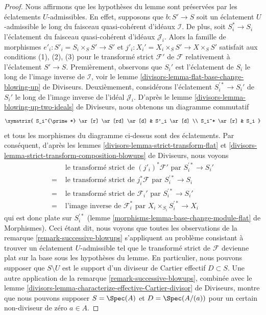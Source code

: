 \begin{proof}
Nous affirmons que les hypothèses du lemme sont préservées par les éclatements $U$-admissibles.
En effet, supposons que $b : S' \to S$ soit un éclatement $U$-admissible le long du
faisceau quasi-cohérent d'idéaux $\mathcal{I}$. De plus, soit $S^*_i \to S_i$
l'éclatement du faisceau quasi-cohérent d'idéaux $\mathcal{J}_i$.
Alors la famille de morphismes $e'_i : S'_i = S_i \times_S S' \to S'$
et $j'_i : X_i' = X_i \times_S S' \to X \times_S S'$ satisfait aux conditions
(1), (2), (3) pour le transformé strict $\mathcal{F}'$ de $\mathcal{F}$
relativement à l'éclatement $S' \to S$. Premièrement, observons que $S_i'$ est
l'éclatement de $S_i$ le long de l'image inverse de $\mathcal{I}$, voir le
lemme \ref{divisors-lemma-flat-base-change-blowing-up} de Diviseurs.
Deuxièmement, considérons l'éclatement
$S_i^{\prime *} \to S_i'$ de $S_i'$ le long de l'image inverse de l'idéal
$\mathcal{J}_i$.
D'après le lemme \ref{divisors-lemma-blowing-up-two-ideals} de Diviseurs,
nous obtenons un diagramme commutatif
$$
\xymatrix{
S_i^{\prime *} \ar[r] \ar[rd] \ar[d] & S'_i \ar[d] \\
S_i^* \ar[r] & S_i
}
$$
et tous les morphismes du diagramme ci-dessus sont des éclatements. Par conséquent, d'après les
lemmes \ref{divisors-lemma-strict-transform-flat} et
\ref{divisors-lemma-strict-transform-composition-blowups} de Diviseurs,
nous voyons
\begin{align*}
& \text{ le transformé strict de }(j'_i)^*\mathcal{F}'\text{ par }
S_i^{\prime *} \to S_i' \\
= &
\text{ le transformé strict de }j_i^*\mathcal{F}\text{ par }
S_i^{\prime *} \to S_i \\
= &
\text{ le transformé strict de }\mathcal{F}_i'\text{ par }
S_i^{\prime *} \to S_i' \\
= &
\text{ l'image inverse de }\mathcal{F}_i^*\text{ par }
X_i \times_{S_i} S_i^{\prime *} \to X_i
\end{align*}
qui est donc plate sur $S_i^{\prime *}$
(lemme \ref{morphisms-lemma-base-change-module-flat} de Morphismes).
Ceci étant dit, nous voyons que toutes les observations de la
remarque \ref{remark-successive-blowups} s'appliquent au
problème consistant à trouver un éclatement $U$-admissible tel que le
transformé strict de $\mathcal{F}$ devienne plat sur la base
sous les hypothèses du lemme. En particulier, nous pouvons supposer
que $S \setminus U$ est le support d'un diviseur de Cartier effectif
$D \subset S$. Une autre application de la remarque \ref{remark-successive-blowups},
combinée avec le
lemme \ref{divisors-lemma-characterize-effective-Cartier-divisor} de Diviseurs,
montre que nous pouvons supposer $S = \Spec(A)$ et $D = \Spec(A/(a))$
pour un certain non-diviseur de zéro $a \in A$.


\end{proof}
